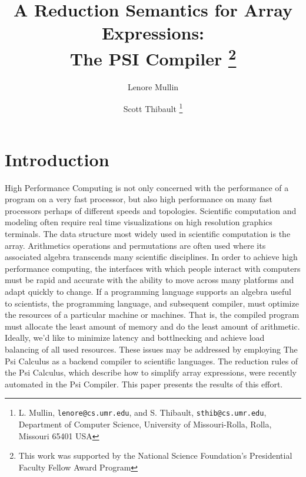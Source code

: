 \newcommand{\cat}{+\!\!\!\!+}
\newcommand{\take}{\,\bigtriangleup\,}
\newcommand{\drop}{\,\bigtriangledown\,}
\newcommand{\karate}{\!\widehat{\hbox to 10pt{}}\!}
\newcommand{\rshp}{\widehat{\rho}}
\newcommand{\one}{<\! 1\!>}
\newtheorem{definition}{Definition}
\newcommand{\Size}{\tau\,}
\newcommand{\Dim}{\delta\,}
\newcommand{\Ravel}{\,\mbox{\tt rav}\,}
\newcommand{\Reshape}{\,\widehat{\rho}\,}
\newcommand{\Reduce}{\,\mbox{\tt red}\,}
 
 
\title{A Reduction Semantics for Array Expressions:\\The PSI Compiler
\thanks{This work was supported by the National Science
          Foundation's Presidential Faculty Fellow Award Program}}
\author{Lenore Mullin \and Scott Thibault
\thanks{L. Mullin, {\tt lenore@cs.umr.edu}, 
and S. Thibault, {\tt sthib@cs.umr.edu}, Department of
     Computer Science, University of Missouri-Rolla, Rolla, Missouri 65401
USA}}

\maketitle
\section*{Introduction} 
High Performance Computing is not only concerned with the performance of
a program on a very fast processor, but also high performance
on many fast processors perhaps of different speeds and topologies. 
Scientific computation and modeling often require real time
visualizations on high resolution graphics terminals. The 
data structure most widely used in scientific computation is the
array. Arithmetics operations and permutations are often used
where its associated algebra transcends many
scientific disciplines. In order to achieve high performance
computing, the interfaces with which people interact with computers
must be rapid and accurate with the ability to move across
many platforms and adapt quickly to change. If a programming
language supports an algebra useful to scientists, the programming
language, and subsequent compiler, must optimize the resources of
a particular machine or machines. That is, the compiled
program must allocate the least amount of memory and do the least
amount of arithmetic. Ideally, we'd like to minimize
latency and bottlnecking and achieve load balancing of all used
resources. These issues may be addressed by employing
The Psi Calculus\cite{mul88,mdst92,mdst93,mdst94,tm93} 
as a backend compiler to scientific languages. 
The reduction rules of the Psi Calculus, which
describe how to simplify array expressions,
were recently automated in the Psi
Compiler\cite{tm93}. This paper presents the results of this effort.


